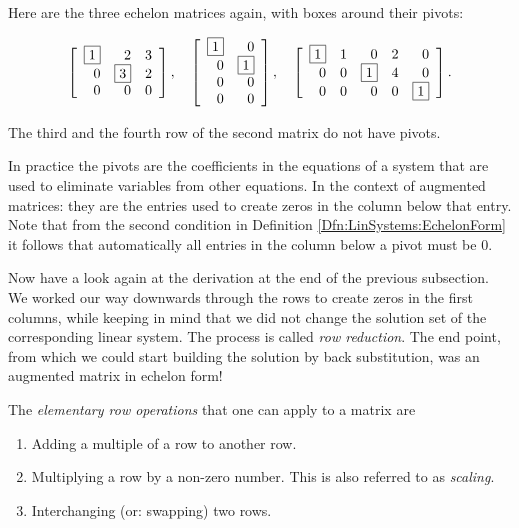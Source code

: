 \begin{ex}
\label{Ex:LinSystems:PivotsInMatrices}
Here are the three echelon matrices again, with boxes around their pivots:

$$

 \left[
\begin{array}{rrr}\fbox{1} & 2 & 3 \\ 0 & \fbox{3} & 2 \\ 0 & 0 & 0 \end{array}  \right], \quad
 \left[
\begin{array}{rr}\fbox{1} & 0 \\ 0 & \fbox{1} \\ 0 & 0 \\ 0 & 0 \end{array}  \right], \quad 
 \left[
\begin{array}{rrrrr}\fbox{1} & 1 & 0 &  2 &  0\\ 0 & 0 & \fbox{1} & 4 & 0\\ 0 & 0 & 0 & 0 & \fbox{1}\end{array}  \right].
$$

The third and the fourth row of the second matrix do not have pivots.
\end{ex}


\begin{rem}
In practice the pivots are the coefficients in the equations of a system that are used to eliminate variables from other equations.  In the context of augmented matrices:  they are the entries used to create zeros in the column below that entry. \\
Note that from the second condition in Definition \ref{Dfn:LinSystems:EchelonForm} it follows that automatically all entries in the column below a pivot must be 0.
\end{rem}

Now have a look again at the derivation at the end of the previous subsection. We worked our way downwards through the rows to create zeros in the first columns, while keeping in mind that we did not change the solution set of the corresponding linear system. The process is called \emph{row reduction}.  The end point, from which we could start building the solution by back substitution, was an augmented matrix in echelon form!


\medskip

\begin{dfn}
\label{Dfn:LinSystems:RowOperations}
The \emph{elementary row operations} that one can apply to a matrix are

\begin{enumerate}[label=(\roman*)]
\item Adding a multiple of a row to another row.
\item Multiplying a row by a non-zero number.  This is also referred to as \emph{scaling}.
\item Interchanging (or: swapping) two rows.
\end{enumerate}

\end{dfn}


